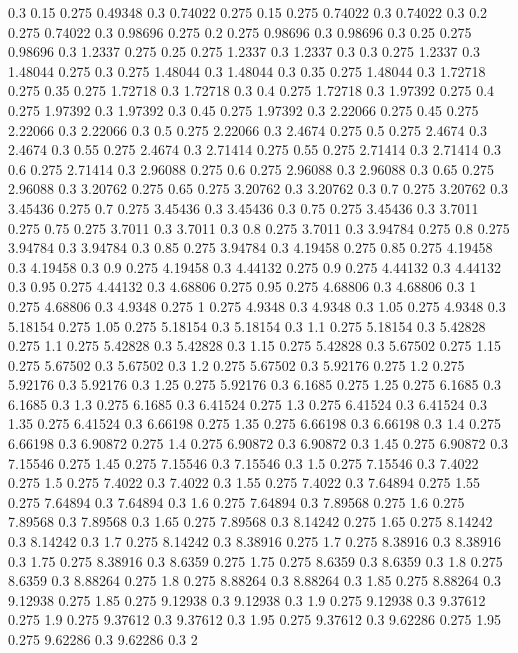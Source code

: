 0.3 0.15
0.275 0.49348
0.3 0.74022
0.275 0.15
0.275 0.74022
0.3 0.74022
0.3 0.2
0.275 0.74022
0.3 0.98696
0.275 0.2
0.275 0.98696
0.3 0.98696
0.3 0.25
0.275 0.98696
0.3 1.2337
0.275 0.25
0.275 1.2337
0.3 1.2337
0.3 0.3
0.275 1.2337
0.3 1.48044
0.275 0.3
0.275 1.48044
0.3 1.48044
0.3 0.35
0.275 1.48044
0.3 1.72718
0.275 0.35
0.275 1.72718
0.3 1.72718
0.3 0.4
0.275 1.72718
0.3 1.97392
0.275 0.4
0.275 1.97392
0.3 1.97392
0.3 0.45
0.275 1.97392
0.3 2.22066
0.275 0.45
0.275 2.22066
0.3 2.22066
0.3 0.5
0.275 2.22066
0.3 2.4674
0.275 0.5
0.275 2.4674
0.3 2.4674
0.3 0.55
0.275 2.4674
0.3 2.71414
0.275 0.55
0.275 2.71414
0.3 2.71414
0.3 0.6
0.275 2.71414
0.3 2.96088
0.275 0.6
0.275 2.96088
0.3 2.96088
0.3 0.65
0.275 2.96088
0.3 3.20762
0.275 0.65
0.275 3.20762
0.3 3.20762
0.3 0.7
0.275 3.20762
0.3 3.45436
0.275 0.7
0.275 3.45436
0.3 3.45436
0.3 0.75
0.275 3.45436
0.3 3.7011
0.275 0.75
0.275 3.7011
0.3 3.7011
0.3 0.8
0.275 3.7011
0.3 3.94784
0.275 0.8
0.275 3.94784
0.3 3.94784
0.3 0.85
0.275 3.94784
0.3 4.19458
0.275 0.85
0.275 4.19458
0.3 4.19458
0.3 0.9
0.275 4.19458
0.3 4.44132
0.275 0.9
0.275 4.44132
0.3 4.44132
0.3 0.95
0.275 4.44132
0.3 4.68806
0.275 0.95
0.275 4.68806
0.3 4.68806
0.3 1
0.275 4.68806
0.3 4.9348
0.275 1
0.275 4.9348
0.3 4.9348
0.3 1.05
0.275 4.9348
0.3 5.18154
0.275 1.05
0.275 5.18154
0.3 5.18154
0.3 1.1
0.275 5.18154
0.3 5.42828
0.275 1.1
0.275 5.42828
0.3 5.42828
0.3 1.15
0.275 5.42828
0.3 5.67502
0.275 1.15
0.275 5.67502
0.3 5.67502
0.3 1.2
0.275 5.67502
0.3 5.92176
0.275 1.2
0.275 5.92176
0.3 5.92176
0.3 1.25
0.275 5.92176
0.3 6.1685
0.275 1.25
0.275 6.1685
0.3 6.1685
0.3 1.3
0.275 6.1685
0.3 6.41524
0.275 1.3
0.275 6.41524
0.3 6.41524
0.3 1.35
0.275 6.41524
0.3 6.66198
0.275 1.35
0.275 6.66198
0.3 6.66198
0.3 1.4
0.275 6.66198
0.3 6.90872
0.275 1.4
0.275 6.90872
0.3 6.90872
0.3 1.45
0.275 6.90872
0.3 7.15546
0.275 1.45
0.275 7.15546
0.3 7.15546
0.3 1.5
0.275 7.15546
0.3 7.4022
0.275 1.5
0.275 7.4022
0.3 7.4022
0.3 1.55
0.275 7.4022
0.3 7.64894
0.275 1.55
0.275 7.64894
0.3 7.64894
0.3 1.6
0.275 7.64894
0.3 7.89568
0.275 1.6
0.275 7.89568
0.3 7.89568
0.3 1.65
0.275 7.89568
0.3 8.14242
0.275 1.65
0.275 8.14242
0.3 8.14242
0.3 1.7
0.275 8.14242
0.3 8.38916
0.275 1.7
0.275 8.38916
0.3 8.38916
0.3 1.75
0.275 8.38916
0.3 8.6359
0.275 1.75
0.275 8.6359
0.3 8.6359
0.3 1.8
0.275 8.6359
0.3 8.88264
0.275 1.8
0.275 8.88264
0.3 8.88264
0.3 1.85
0.275 8.88264
0.3 9.12938
0.275 1.85
0.275 9.12938
0.3 9.12938
0.3 1.9
0.275 9.12938
0.3 9.37612
0.275 1.9
0.275 9.37612
0.3 9.37612
0.3 1.95
0.275 9.37612
0.3 9.62286
0.275 1.95
0.275 9.62286
0.3 9.62286
0.3 2
